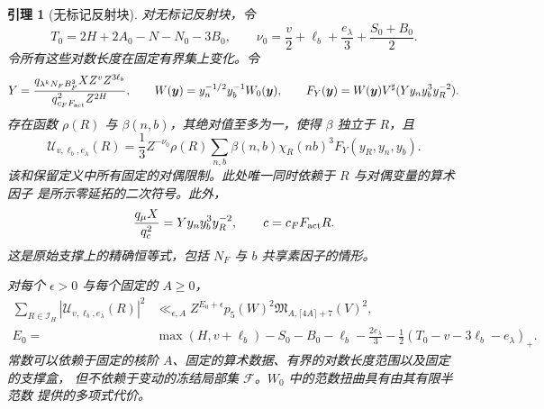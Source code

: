 \documentclass[11pt,a4paper]{article}
\numberwithin{equation}{section}
\numberwithin{figure}{section}
\newtheorem{lemma}[theorem]{引理}
\theoremstyle{definition}
\theoremstyle{remark}
\begin{document}
\begin{lemma}[无标记反射块]
\label{lem:unmarked-reflected-block}
对无标记反射块，令
\[
 T_0=2H+2A_0-N-N_0-3B_0,\qquad
 \nu_0=\frac v2+\ell_b+\frac{e_\lambda}{3}+\frac{S_0+B_0}{2}.
\]
令所有这些对数长度在固定有界集上变化。令
\[
 Y=\frac{q_{\lambda^kN_FB_F^3}X Z^vZ^{3\ell_b}}
          {q_{c_FF_{\rm act}}^2Z^{2H}},\qquad
 W(\boldsymbol y)=y_n^{-1/2}y_b^{-1}W_0(\boldsymbol y),\qquad
 F_Y(\boldsymbol y)=W(\boldsymbol y)V^\sharp(Yy_ny_b^3y_R^{-2}).
\]
存在函数 $\rho(R)$ 与 $\beta(n,b)$，其绝对值至多为一，使得 $\beta$ 独立于 $R$，且
\begin{equation}\label{eq:unmarked-structural-block}
 \mathcal U_{v,\ell_b,e_\lambda}(R)
 =\frac13 Z^{-\nu_0}\rho(R)
       \sum_{n,b}\beta(n,b)\chi_R(nb)^3F_Y(y_R,y_n,y_b).
\end{equation}
该和保留定义中所有固定的对偶限制。此处唯一同时依赖于 $R$ 与对偶变量的算术因子
是所示零延拓的二次符号。此外，
\begin{equation}\label{eq:unmarked-actual-annuli}
 \frac{q_\mu X}{q_c^2}=Yy_ny_b^3y_R^{-2},\qquad
 c=c_FF_{\rm act}R.
\end{equation}
这是原始支撑上的精确恒等式，包括 $N_F$ 与 $b$ 共享素因子的情形。

对每个 $\epsilon>0$ 与每个固定的 $A\ge0$，
\begin{equation}\label{eq:unmarked-reflected-energy}
 \begin{split}
 \sum_{R\in\mathcal I_H}|\mathcal U_{v,\ell_b,e_\lambda}(R)|^2
 &\ll_{\epsilon,A} Z^{E_0+\epsilon}p_5(W)^2
       \mathfrak M_{A,\lceil4A\rceil+7}(V)^2,\\
 E_0={}&\max(H,v+\ell_b)-S_0-B_0-\ell_b-\frac{2e_\lambda}{3}
       -\frac12(T_0-v-3\ell_b-e_\lambda)_+.
 \end{split}
\end{equation}
常数可以依赖于固定的核阶 $A$、固定的算术数据、有界的对数长度范围以及固定的支撑盒，
但不依赖于变动的冻结局部集 $\mathcal F$。$W_0$ 中的范数扭曲具有由其有限半范数
提供的多项式代价。
\end{lemma}
\end{document}
